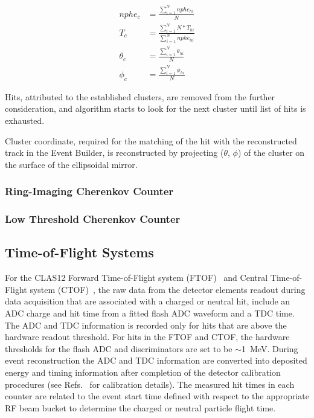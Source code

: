 \documentclass{elsart}
\begin{document}
\begin{eqnarray*}
nphe_c &= \frac{\sum_{i=1}^{N}{nphe_{hi}}}{N}\\
T_c &= \frac{\sum_{i=1}^{N}{N*T_{hi}}}{\sum_{i=1}^{N}{nphe_{hi}}}\\	
\theta_c &=\frac{\sum_{i=1}^{N}{\theta_{hi}}}{N}\\
\phi_c &= \frac{\sum_{i=1}^{N}{\phi_{hi}}}{N}
\end{eqnarray*}

Hits, attributed to the established clusters, are removed from the further consideration, and algorithm starts to
look for the next cluster until list of hits is exhausted. 
	 
Cluster coordinate, required for the matching of the hit with the reconstructed track in the Event Builder, is
reconstructed by projecting  ($\theta$, $\phi$) of the cluster on the surface of the ellipsoidal mirror.		

\subsubsection{Ring-Imaging Cherenkov Counter}

\subsubsection{Low Threshold Cherenkov Counter}

\subsection{Time-of-Flight Systems}

For the CLAS12 Forward Time-of-Flight system (FTOF)~\cite{ftof-nim} and Central Time-of-Flight system
(CTOF)~\cite{ctof-nim}, the raw data from the detector elements readout during data acquisition that are
associated with a charged or neutral hit, include an ADC charge and hit time from a fitted flash ADC waveform
and a TDC time. The ADC and TDC information is recorded only for hits that are above the hardware readout
threshold. For hits in the FTOF and CTOF, the hardware thresholds for the flash ADC and discriminators are set
to be $\sim$1~MeV. During event reconstruction the ADC and TDC information are converted into deposited energy
and timing information after completion of the detector calibration procedures (see Refs.~\cite{ftof-nim,ctof-nim}
for calibration details). The measured hit times in each counter are related to the event start time defined with
respect to the appropriate RF beam bucket to determine the charged or neutral particle flight time.
\end{document}
